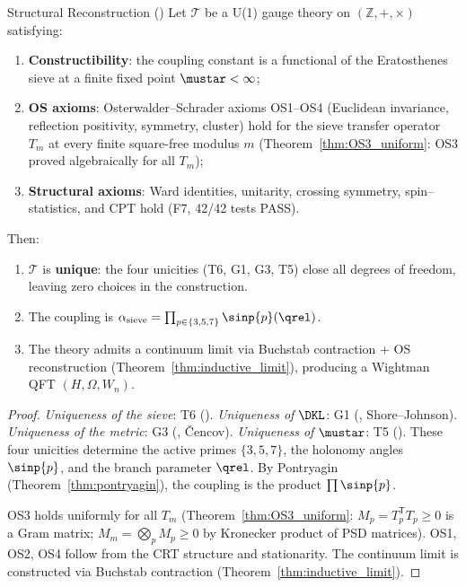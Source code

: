 \documentclass[12pt,a4paper]{article}
\begin{document}
\begin{thmbox}{Structural Reconstruction (\THMTAG)}\mTHM
\label{thm:structural_reconstruction}
Let $\mathcal{T}$ be a U(1) gauge theory on $(\mathbb{Z}, +, \times)$ satisfying:
\begin{enumerate}[nosep, label=\textbf{(SR\arabic*)}]
\item \textbf{Constructibility}: the coupling constant is a functional of the
  Eratosthenes sieve at a finite fixed point $\mustar < \infty$;
\item \textbf{OS axioms}: Osterwalder--Schrader axioms OS1--OS4
  (Euclidean invariance, reflection positivity, symmetry, cluster)
  hold for the sieve transfer operator $T_m$ at every finite
  square-free modulus $m$ (Theorem~\ref{thm:OS3_uniform}: OS3 proved
  algebraically for all $T_m$);
\item \textbf{Structural axioms}: Ward identities, unitarity, crossing
  symmetry, spin--statistics, and CPT hold (F7, 42/42 tests PASS).
\end{enumerate}
Then:
\begin{enumerate}[nosep, label=(\roman*)]
\item $\mathcal{T}$ is \textbf{unique}: the four unicities (T6, G1, G3, T5) close all
  degrees of freedom, leaving zero choices in the construction.
\item The coupling is $\alpha_{\rm sieve} = \prod_{p \in \{3,5,7\}} \sinp{p}(\qrel)$.
\item The theory admits a continuum limit via Buchstab contraction
  + OS reconstruction (Theorem~\ref{thm:inductive_limit}), producing
  a Wightman QFT $(H, \Omega, W_n)$.
\end{enumerate}
\begin{proof}
\emph{Uniqueness of the sieve}: T6 (\cite{companion_M2}).
\emph{Uniqueness of $\DKL$}: G1 (\cite{companion_M2}, Shore--Johnson).
\emph{Uniqueness of the metric}: G3 (\cite{companion_M2}, \v{C}encov).
\emph{Uniqueness of $\mustar$}: T5 (\cite{companion_M3}).
These four unicities determine the active primes $\{3,5,7\}$,
the holonomy angles $\sinp{p}$, and the branch parameter $\qrel$.
By Pontryagin (Theorem~\ref{thm:pontryagin}), the coupling is
the product $\prod \sinp{p}$.

OS3 holds uniformly for all $T_m$ (Theorem~\ref{thm:OS3_uniform}:
$M_p = T_p^{\mathsf{T}} T_p \geq 0$ is a Gram matrix;
$M_m = \bigotimes_p M_p \geq 0$ by Kronecker product of PSD matrices).
OS1, OS2, OS4 follow from the CRT structure and stationarity.
The continuum limit is constructed via Buchstab contraction
(Theorem~\ref{thm:inductive_limit}).
\end{proof}
\end{thmbox}
\end{document}
